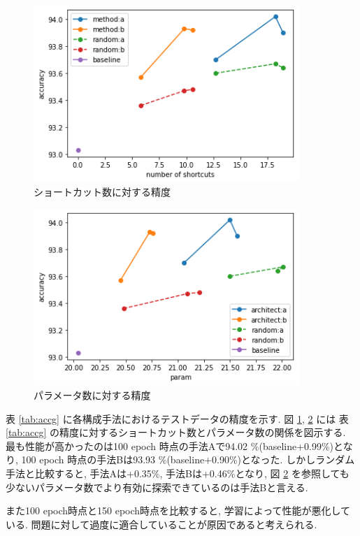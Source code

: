 \begin{figure}[t]
  \begin{center}
    \includegraphics[clip,width=10cm]{./fig/short.png}
  \end{center}
  \caption{ショートカット数に対する精度}
  \label{fig:short}
\end{figure}
\begin{figure}[t]
  \begin{center}
    \includegraphics[clip,width=10cm]{./fig/param.png}
  \end{center}
  \caption{パラメータ数に対する精度}
  \label{fig:param}
\end{figure}

表 \ref{tab:accg} に各構成手法におけるテストデータの精度を示す.
図 \ref{fig:short}, \ref{fig:param} には
表 \ref{tab:accg} の精度に対するショートカット数とパラメータ数の関係を図示する.
最も性能が高かったのは100 epoch 時点の手法Aで94.02 \%(baseline+0.99\%)となり,
100 epoch 時点の手法Bは93.93 \%(baseline+0.90\%)となった.
しかしランダム手法と比較すると, 手法Aは+0.35\%, 手法Bは+0.46\%となり,
図 \ref{fig:param} を参照しても少ないパラメータ数でより有効に探索できているのは手法Bと言える.

また100 epoch時点と150 epoch時点を比較すると, 学習によって性能が悪化している.
問題に対して過度に適合していることが原因であると考えられる.

